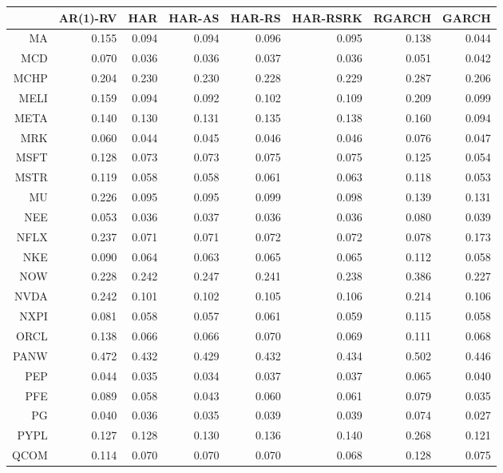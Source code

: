\begin{table}[ht]
\centering
\begin{tabular}{rrrrrrrr}
  \hline
 & AR(1)-RV & HAR & HAR-AS & HAR-RS & HAR-RSRK & RGARCH & GARCH \\ 
  \hline
MA & 0.155 & 0.094 & 0.094 & 0.096 & 0.095 & 0.138 & 0.044 \\ 
  MCD & 0.070 & 0.036 & 0.036 & 0.037 & 0.036 & 0.051 & 0.042 \\ 
  MCHP & 0.204 & 0.230 & 0.230 & 0.228 & 0.229 & 0.287 & 0.206 \\ 
  MELI & 0.159 & 0.094 & 0.092 & 0.102 & 0.109 & 0.209 & 0.099 \\ 
  META & 0.140 & 0.130 & 0.131 & 0.135 & 0.138 & 0.160 & 0.094 \\ 
  MRK & 0.060 & 0.044 & 0.045 & 0.046 & 0.046 & 0.076 & 0.047 \\ 
  MSFT & 0.128 & 0.073 & 0.073 & 0.075 & 0.075 & 0.125 & 0.054 \\ 
  MSTR & 0.119 & 0.058 & 0.058 & 0.061 & 0.063 & 0.118 & 0.053 \\ 
  MU & 0.226 & 0.095 & 0.095 & 0.099 & 0.098 & 0.139 & 0.131 \\ 
  NEE & 0.053 & 0.036 & 0.037 & 0.036 & 0.036 & 0.080 & 0.039 \\ 
  NFLX & 0.237 & 0.071 & 0.071 & 0.072 & 0.072 & 0.078 & 0.173 \\ 
  NKE & 0.090 & 0.064 & 0.063 & 0.065 & 0.065 & 0.112 & 0.058 \\ 
  NOW & 0.228 & 0.242 & 0.247 & 0.241 & 0.238 & 0.386 & 0.227 \\ 
  NVDA & 0.242 & 0.101 & 0.102 & 0.105 & 0.106 & 0.214 & 0.106 \\ 
  NXPI & 0.081 & 0.058 & 0.057 & 0.061 & 0.059 & 0.115 & 0.058 \\ 
  ORCL & 0.138 & 0.066 & 0.066 & 0.070 & 0.069 & 0.111 & 0.068 \\ 
  PANW & 0.472 & 0.432 & 0.429 & 0.432 & 0.434 & 0.502 & 0.446 \\ 
  PEP & 0.044 & 0.035 & 0.034 & 0.037 & 0.037 & 0.065 & 0.040 \\ 
  PFE & 0.089 & 0.058 & 0.043 & 0.060 & 0.061 & 0.079 & 0.035 \\ 
  PG & 0.040 & 0.036 & 0.035 & 0.039 & 0.039 & 0.074 & 0.027 \\ 
  PYPL & 0.127 & 0.128 & 0.130 & 0.136 & 0.140 & 0.268 & 0.121 \\ 
  QCOM & 0.114 & 0.070 & 0.070 & 0.070 & 0.068 & 0.128 & 0.075 \\ 

\end{tabular}
\end{table}
